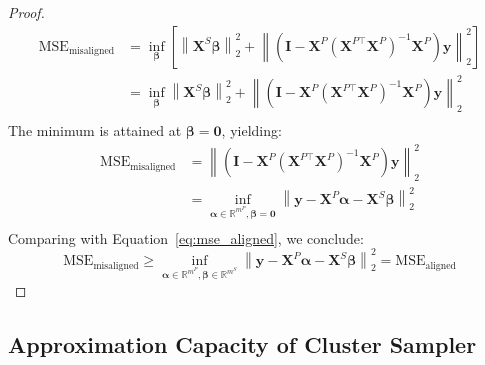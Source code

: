 \begin{proof}
\begin{align}
    \mathrm{MSE}_{\mathrm{misaligned}}
    & = \inf_{\boldsymbol{\beta}} \left[\left\|\mathbf{X}^S \boldsymbol{\beta}\right\|_2^2 + \left\|(\mathbf{I} - \mathbf{X}^P (\mathbf{X}^{P \top} \mathbf{X}^P)^{-1} \mathbf{X}^P)\mathbf{y}\right\|_2^2\right] \\
    & = \inf_{\boldsymbol{\beta}} \left\|\mathbf{X}^S \boldsymbol{\beta}\right\|_2^2 + \left\|(\mathbf{I} - \mathbf{X}^P (\mathbf{X}^{P \top} \mathbf{X}^P)^{-1} \mathbf{X}^P)\mathbf{y}\right\|_2^2 \\
\end{align}
The minimum is attained at $\boldsymbol{\beta} = \mathbf{0}$, yielding:
\begin{align}
    \mathrm{MSE}_{\mathrm{misaligned}}
    & = \left\|(\mathbf{I} - \mathbf{X}^P (\mathbf{X}^{P \top} \mathbf{X}^P)^{-1} \mathbf{X}^P)\mathbf{y}\right\|_2^2 \\
    & = \inf_{\boldsymbol{\alpha} \in \mathbb{R}^{m^P}, \boldsymbol{\beta} = \mathbf{0}} \left\|\mathbf{y} - \mathbf{X}^P \boldsymbol{\alpha} - \mathbf{X}^S \boldsymbol{\beta}\right\|_2^2 \\
\end{align}
Comparing with Equation~\ref{eq:mse_aligned}, we conclude:
\begin{equation}
    \mathrm{MSE}_{\mathrm{misaligned}} \geq \inf_{\boldsymbol{\alpha} \in \mathbb{R}^{m^P}, \boldsymbol{\beta} \in \mathbb{R}^{m^S}} \left\|\mathbf{y} - \mathbf{X}^P \boldsymbol{\alpha} - \mathbf{X}^S \boldsymbol{\beta}\right\|_2^2 = \mathrm{MSE}_{\mathrm{aligned}}
\end{equation}
\end{proof}





















\subsection{Approximation Capacity of Cluster Sampler}\label{subsec:proof-cluster-sampler}

